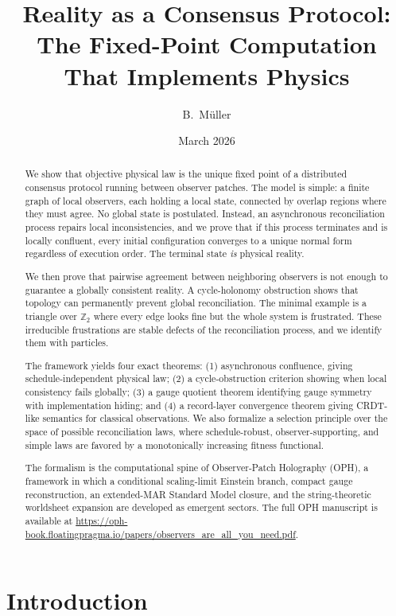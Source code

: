 \documentclass[11pt]{article}
\title{Reality as a Consensus Protocol:\\
The Fixed-Point Computation That Implements Physics}
\author{B.\ M\"uller}
\date{March 2026}
\begin{document}
\maketitle

\begin{abstract}
We show that objective physical law is the unique fixed point of a distributed consensus protocol running between observer patches. The model is simple: a finite graph of local observers, each holding a local state, connected by overlap regions where they must agree. No global state is postulated. Instead, an asynchronous reconciliation process repairs local inconsistencies, and we prove that if this process terminates and is locally confluent, every initial configuration converges to a unique normal form regardless of execution order. The terminal state \emph{is} physical reality.

We then prove that pairwise agreement between neighboring observers is not enough to guarantee a globally consistent reality. A cycle-holonomy obstruction shows that topology can permanently prevent global reconciliation. The minimal example is a triangle over $\mathbb{Z}_2$ where every edge looks fine but the whole system is frustrated. These irreducible frustrations are stable defects of the reconciliation process, and we identify them with particles.

The framework yields four exact theorems: (1) asynchronous confluence, giving schedule-independent physical law; (2) a cycle-obstruction criterion showing when local consistency fails globally; (3) a gauge quotient theorem identifying gauge symmetry with implementation hiding; and (4) a record-layer convergence theorem giving CRDT-like semantics for classical observations. We also formalize a selection principle over the space of possible reconciliation laws, where schedule-robust, observer-supporting, and simple laws are favored by a monotonically increasing fitness functional.

The formalism is the computational spine of Observer-Patch Holography (OPH), a framework in which a conditional scaling-limit Einstein branch, compact gauge reconstruction, an extended-MAR Standard Model closure, and the string-theoretic worldsheet expansion are developed as emergent sectors. The full OPH manuscript is available at \url{https://oph-book.floatingpragma.io/papers/observers_are_all_you_need.pdf}.
\end{abstract}

\section{Introduction}
\end{document}
